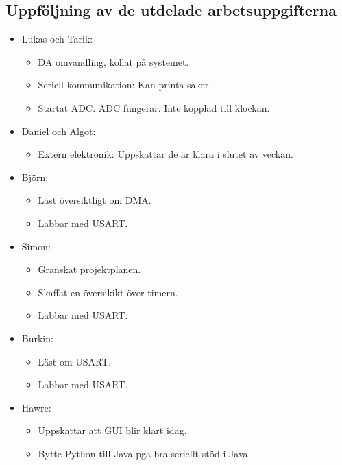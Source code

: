\documentclass[a4paper, 10pt]{article}
\newcommand{\ssect}[1][]{\subsection*{#1}}
\begin{document}
\ssect[Uppföljning av de utdelade arbetsuppgifterna]
\begin{itemize}[noitemsep]

    \item Lukas och Tarik:
    \begin{itemize}[noitemsep]
    	\item DA omvandling, kollat på systemet.
	    \item Seriell kommunikation: Kan printa saker.
        \item Startat ADC. ADC fungerar. Inte kopplad till klockan.
    \end{itemize}
    
    \item Daniel och Algot:
    \begin{itemize}[noitemsep]
    	\item Extern elektronik: Uppskattar de är klara i slutet av veckan.
    \end{itemize}
    
    \item Björn:
    \begin{itemize}[noitemsep]
        \item Läst översiktligt om DMA. 
        \item Labbar med USART.
    \end{itemize}
    
    \item Simon: 
    \begin{itemize}[noitemsep]
        \item Granskat projektplanen.
        \item Skaffat en översikikt över timern.
        \item Labbar med USART.
    \end{itemize}
    
    \item Burkin:
    \begin{itemize}[noitemsep]
        \item Läst om USART.
        \item Labbar med USART.
    \end{itemize}
    
    \item Hawre:
    \begin{itemize}[noitemsep]
    	\item Uppskattar att GUI blir klart idag. 
    	\item Bytte Python till Java pga bra seriellt stöd i Java.
    \end{itemize}
\end{itemize}
    
\end{document}
